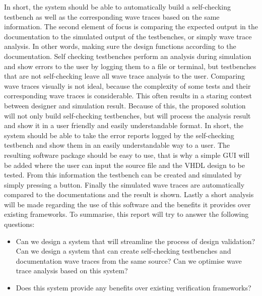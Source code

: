 \npar
In short, the system should be able to automatically build a self-checking testbench as well as the corresponding wave traces based on the same information.
\npar
The second element of focus is comparing the expected output in the documentation to the simulated output of the testbenches, or simply wave trace analysis. In other words, making sure the design functions according to the documentation. Self checking testbenches perform an analysis during simulation and show errors to the user by logging them to a file or terminal, but testbenches that are not self-checking leave all wave trace analysis to the user. Comparing wave traces visually is not ideal, because the complexity of some tests and their corresponding wave traces is considerable. This often results in a staring contest between designer and simulation result. Because of this, the proposed solution will not only build self-checking testbenches, but will process the analysis result and show it in a user friendly and easily understandable format. 
\npar
In short, the system should be able to take the error reports logged by the self-checking testbench and show them in an easily understandable way to a user.
\npar
The resulting software package should be easy to use, that is why a simple GUI will be added where the user can input the source file and the VHDL design to be tested. From this information the testbench can be created and simulated by simply pressing a button. Finally the simulated wave traces are automatically compared to the documentations and the result is shown.
\npar
Lastly a short analysis will be made regarding the use of this software and the benefits it provides over existing frameworks.
\newpage
To summarise, this report will try to answer the following questions:
\begin{itemize}
	\item Can we design a system that will streamline the process of design validation?
	\subitem Can we design a system that can create self-checking testbenches and
	\subsubitem documentation wave traces from the same source?
	\subitem Can we optimise wave trace analysis based on this system?
	\item Does this system provide any benefits over existing verification frameworks?	
\end{itemize}